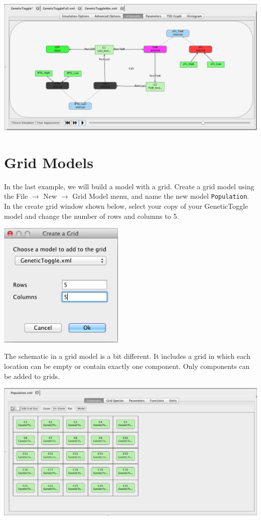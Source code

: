 \documentclass[titlepage,11pt]{article}
\begin{document}
\begin{center}
\includegraphics[width=160mm]{screenshots/movieViewGT}
\end{center}

\section{Grid Models}

In the last example, we will build a model with a grid. 
Create a grid model using the File $\rightarrow$ New $\rightarrow$ Grid Model menu, and name the new model {\tt Population}.  In the create grid window shown below, select your copy of your GeneticToggle model and change the number of rows and columns to 5.  

\begin{center}
\includegraphics[width=60mm]{screenshots/createGridGT}
\end{center}

The schematic in a grid model is a bit different.  It includes a grid in which each location can be empty or contain exactly one component.  Only components can be added to grids.

\begin{center}
\includegraphics[width=160mm]{screenshots/gridModelGT}
\end{center}
\end{document}
